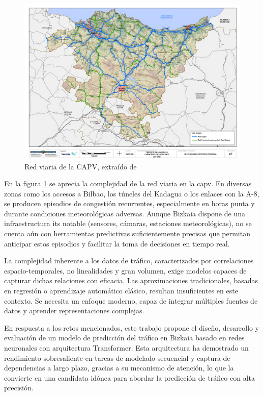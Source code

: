 \begin{figure}[h]
	\centering
	\includegraphics[scale=0.5]{includes/red_viaria_capv.png}
	\caption[Red viaria de la CAPV]{Red viaria de la CAPV, extraído de \cite{pgcpv}}
	\label{fig:red_viaria}
\end{figure}


En la figura \ref{fig:red_viaria} se aprecia la complejidad de la red viaria en la \acrshort{capv}. En diversas zonas como los accesos a Bilbao, los túneles del Kadagua o los enlaces con la A-8, se producen episodios de congestión recurrentes, especialmente en horas punta y durante condiciones meteorológicas adversas. Aunque Bizkaia dispone de una infraestructura \acrshort{its} notable (sensores, cámaras, estaciones meteorológicas), no se cuenta aún con herramientas predictivas suficientemente precisas que permitan anticipar estos episodios y facilitar la toma de decisiones en tiempo real.

La complejidad inherente a los datos de tráfico, caracterizados por correlaciones espacio-temporales, no linealidades y gran volumen, exige modelos capaces de capturar dichas relaciones con eficacia. Las aproximaciones tradicionales, basadas en regresión o aprendizaje automático clásico, resultan insuficientes en este contexto. Se necesita un enfoque moderno, capaz de integrar múltiples fuentes de datos y aprender representaciones complejas.

En respuesta a los retos mencionados, este trabajo propone el diseño, desarrollo y evaluación de un modelo de predicción del tráfico en Bizkaia basado en redes neuronales con arquitectura Transformer. Esta arquitectura ha demostrado un rendimiento sobresaliente en tareas de modelado secuencial y captura de dependencias a largo plazo, gracias a su mecanismo de atención, lo que la convierte en una candidata idónea para abordar la predicción de tráfico con alta precisión.

